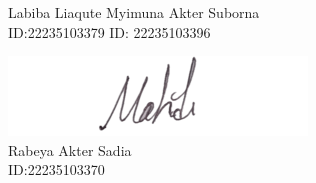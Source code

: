\begin{flushleft}
Labiba Liaqute  \null\hfill Myimuna Akter Suborna \\
ID:22235103379 \null\hfill  ID: 22235103396\\

\vspace{5mm}

\underline{\includegraphics[scale=0.43]{Sign/Mehedii.png}}\\
Rabeya Akter Sadia\\
ID:22235103370 \\ 
\end{flushleft}